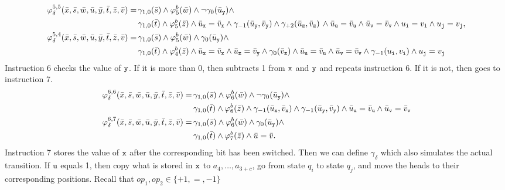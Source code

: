 \begin{align*}
\varphi^{5,5}_{\delta}(\bar{x},\bar{s},\bar{w},\bar{u},\bar{y},\bar{t},\bar{z},\bar{v}) = \,&\gamma_{1,0}(\bar{s}) \wedge \varphi^b_5(\bar{w}) \wedge \neg \gamma_0(\bar{u}_{\mathtt{y}}) \wedge \\ &\gamma_{1,0}(\bar{t}) \wedge \varphi^b_5(\bar{z}) \wedge
\bar{u}_{\mathtt{x}} = \bar{v}_{\mathtt{x}} \wedge
\gamma_{-1}(\bar{u}_{\mathtt{y}},\bar{v}_{\mathtt{y}}) \wedge
\gamma_{+2}(\bar{u}_{\mathtt{z}},\bar{v}_{\mathtt{z}})\, \wedge \bar{u}_{\mathtt{u}} = \bar{v}_{\mathtt{u}} \wedge
\bar{u}_{\mathtt{v}} = \bar{v}_{\mathtt{v}} \wedge
u_{\mathtt{i}} = v_{\mathtt{i}} \wedge u_{\mathtt{j}} = v_{\mathtt{j}},\\
\varphi^{5,4}_{\delta}(\bar{x},\bar{s},\bar{w},\bar{u},\bar{y},\bar{t},\bar{z},\bar{v}) = \,&\gamma_{1,0}(\bar{s}) \wedge \varphi^b_5(\bar{w}) \wedge \gamma_0(\bar{u}_{\mathtt{y}}) \wedge \\ &\gamma_{1,0}(\bar{t}) \wedge \varphi^b_4(\bar{z}) \wedge
\bar{u}_{\mathtt{x}} = \bar{v}_{\mathtt{x}} \wedge
\bar{u}_{\mathtt{z}} = \bar{v}_{\mathtt{y}} \wedge
\gamma_0(\bar{v}_{\mathtt{z}}) \wedge
\bar{u}_{\mathtt{u}} = \bar{v}_{\mathtt{u}} \wedge
\bar{u}_{\mathtt{v}} = \bar{v}_{\mathtt{v}} \wedge
\gamma_{-1}(u_{\mathtt{i}},v_{\mathtt{i}}) \wedge u_{\mathtt{j}} = v_{\mathtt{j}}
\end{align*}
Instruction 6 checks the value of $\mathtt{y}$. If it is more than 0, then subtracts 1 from $\mathtt{x}$ and $\mathtt{y}$ and repeats instruction 6. If it is not, then goes to instruction 7.
\begin{align*}
\varphi^{6,6}_{\delta}(\bar{x},\bar{s},\bar{w},\bar{u},\bar{y},\bar{t},\bar{z},\bar{v}) = \,&\gamma_{1,0}(\bar{s}) \wedge \varphi^b_6(\bar{w}) \wedge \neg \gamma_0(\bar{u}_{\mathtt{y}}) \wedge \\ &\gamma_{1,0}(\bar{t}) \wedge \varphi^b_6(\bar{z}) \wedge
\gamma_{-1}(\bar{u}_{\mathtt{x}},\bar{v}_{\mathtt{x}}) \wedge \gamma_{-1}(\bar{u}_{\mathtt{y}},\bar{v}_{\mathtt{y}}) \wedge \bar{u}_{\mathtt{u}} = \bar{v}_{\mathtt{u}} \wedge \bar{u}_{\mathtt{v}} = \bar{v}_{\mathtt{v}} \\
\varphi^{6,7}_{\delta}(\bar{x},\bar{s},\bar{w},\bar{u},\bar{y},\bar{t},\bar{z},\bar{v}) = \,&\gamma_{1,0}(\bar{s}) \wedge \varphi^b_6(\bar{w}) \wedge \gamma_0(\bar{u}_{\mathtt{y}}) \wedge \\ &\gamma_{1,0}(\bar{t}) \wedge \varphi^b_7(\bar{z}) \wedge \bar{u} = \bar{v}.
\end{align*}
Instruction 7 stores the value of $\mathtt{x}$ after the corresponding bit has been switched. Then we can define $\gamma_{\delta}$ which also simulates the actual transition. If $\mathtt{u}$ equals 1, then copy what is stored in $\mathtt{x}$ to $a_4,\ldots,a_{3+c}$, go from state $q_i$ to state $q_j$, and move the heads to their corresponding positions. Recall that $op_1,op_2\in\{+1,=,-1\}$
